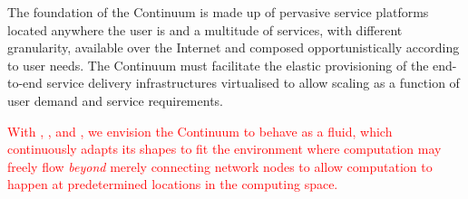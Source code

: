 
The foundation of the Continuum is made up of pervasive service platforms located anywhere the user is and a multitude of services, with different granularity, available over the Internet and composed opportunistically according to user needs.
The Continuum must facilitate the elastic provisioning of the end-to-end service delivery infrastructures virtualised to allow scaling as a function of user demand and service requirements. 

\textcolor{red}{With \cite{latre2014fluid}, \cite{abdelbaky2017computing}, and \cite{beckman2020harnessing}, we envision the Continuum to behave as a fluid, which continuously adapts its shapes to fit the environment where computation may freely flow \textit{beyond} merely connecting network nodes to allow computation to happen at predetermined locations in the computing space.}

